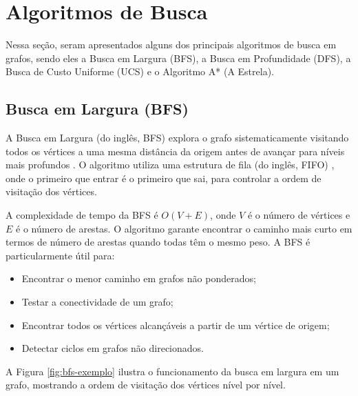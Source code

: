 

\section{Algoritmos de Busca}
Nessa seção, seram apresentados alguns dos principais algoritmos de busca em grafos, sendo eles a Busca em Largura (BFS), 
a Busca em Profundidade (DFS), a Busca de Custo Uniforme (UCS) e o Algoritmo A* (A Estrela).

\subsection{Busca em Largura (BFS)}

A Busca em Largura (do inglês, \gls{BFS}) explora o grafo sistematicamente 
visitando todos os vértices a uma mesma distância da origem antes de avançar para níveis mais 
profundos \cite{CORMEN2012}. O algoritmo utiliza uma estrutura de fila (do inglês, \gls{FIFO})
, onde o primeiro que entrar é o primeiro que sai, para controlar a ordem de visitação dos vértices.

A complexidade de tempo da BFS é $O(V + E)$, onde $V$ é o número de vértices e $E$ é o 
número de arestas. O algoritmo garante encontrar o caminho mais curto em termos de número 
de arestas quando todas têm o mesmo peso. A BFS é particularmente útil para:

\begin{itemize}
    \item Encontrar o menor caminho em grafos não ponderados;
    \item Testar a conectividade de um grafo;
    \item Encontrar todos os vértices alcançáveis a partir de um vértice de origem;
    \item Detectar ciclos em grafos não direcionados.
\end{itemize}

A Figura \ref{fig:bfs-exemplo} ilustra o funcionamento da busca em largura em um grafo, 
mostrando a ordem de visitação dos vértices nível por nível.

